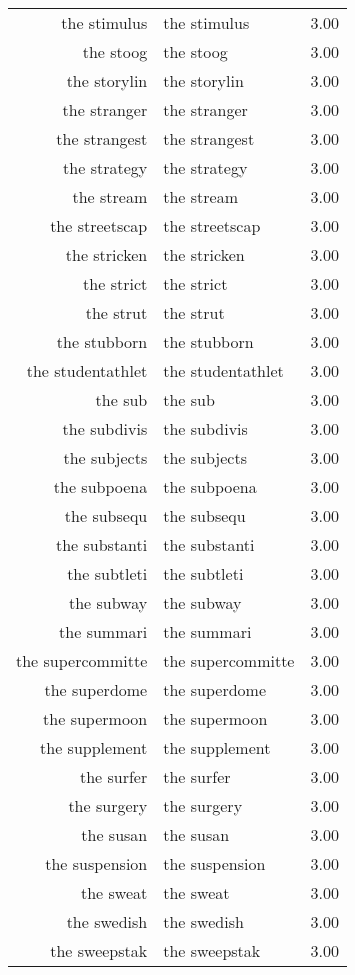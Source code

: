 \begin{table}[ht]
\begin{tabular}{rlr}
  the stimulus & the stimulus & 3.00 \\ 
  the stoog & the stoog & 3.00 \\ 
  the storylin & the storylin & 3.00 \\ 
  the stranger & the stranger & 3.00 \\ 
  the strangest & the strangest & 3.00 \\ 
  the strategy & the strategy & 3.00 \\ 
  the stream & the stream & 3.00 \\ 
  the streetscap & the streetscap & 3.00 \\ 
  the stricken & the stricken & 3.00 \\ 
  the strict & the strict & 3.00 \\ 
  the strut & the strut & 3.00 \\ 
  the stubborn & the stubborn & 3.00 \\ 
  the studentathlet & the studentathlet & 3.00 \\ 
  the sub & the sub & 3.00 \\ 
  the subdivis & the subdivis & 3.00 \\ 
  the subjects & the subjects & 3.00 \\ 
  the subpoena & the subpoena & 3.00 \\ 
  the subsequ & the subsequ & 3.00 \\ 
  the substanti & the substanti & 3.00 \\ 
  the subtleti & the subtleti & 3.00 \\ 
  the subway & the subway & 3.00 \\ 
  the summari & the summari & 3.00 \\ 
  the supercommitte & the supercommitte & 3.00 \\ 
  the superdome & the superdome & 3.00 \\ 
  the supermoon & the supermoon & 3.00 \\ 
  the supplement & the supplement & 3.00 \\ 
  the surfer & the surfer & 3.00 \\ 
  the surgery & the surgery & 3.00 \\ 
  the susan & the susan & 3.00 \\ 
  the suspension & the suspension & 3.00 \\ 
  the sweat & the sweat & 3.00 \\ 
  the swedish & the swedish & 3.00 \\ 
  the sweepstak & the sweepstak & 3.00 \\ 

\end{tabular}
\end{table}
